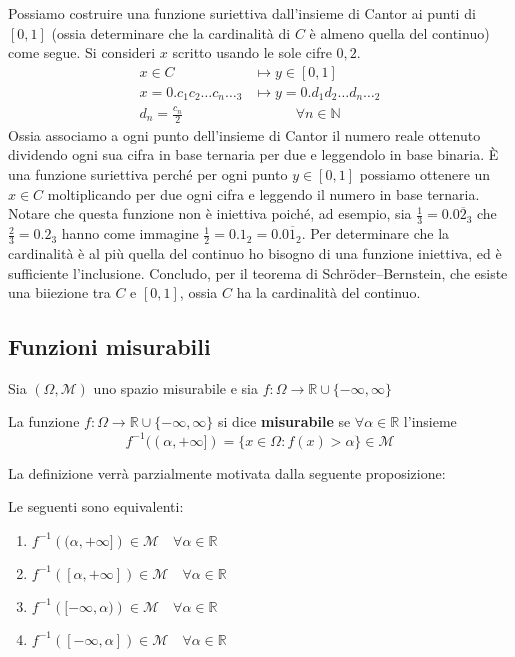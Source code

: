 \begin{example}
    Possiamo costruire una funzione suriettiva
    dall'insieme di Cantor ai punti di \([0, 1]\) (ossia determinare che la cardinalità di \(C\) è almeno quella del continuo) come segue. Si consideri \(x\) scritto usando le sole cifre \(0, 2\). 
    \begin{align*}
        x \in C &\longmapsto y \in [0, 1] \\
        x = 0.c_{1}c_{2}\dots c_{n}\dots_3 &\longmapsto y =
        0.d_{1}d_{2}\dots d_{n}\dots_2 \\
        d_{n} = \frac{c_{n}}{2} \,&\quad\quad\quad \forall n \in \mathbb{N}
    \end{align*}
    Ossia associamo a ogni punto dell'insieme di Cantor il numero reale ottenuto
    dividendo ogni sua cifra in base ternaria per due e leggendolo in base
    binaria. È una funzione suriettiva perché per ogni punto \(y \in [0, 1]\) possiamo
    ottenere un \(x \in C\) moltiplicando per due ogni cifra e leggendo il
    numero in base ternaria. Notare che questa funzione non è iniettiva poiché,
    ad esempio, sia \(\frac{1}{3} = 0.0\overline{2}_3\) che \(\frac{2}{3} =
    0.2_3\) hanno come immagine \(\frac{1}{2} = 0.1_2 = 0.0\overline{1}_2\). Per
    determinare che la cardinalità è al più quella del continuo ho bisogno di
    una funzione iniettiva, ed è sufficiente l'inclusione. Concludo, per il
    teorema di Schröder–Bernstein, che esiste una biiezione tra \(C\) e \(
    [0,1]\), ossia \(C\) ha la cardinalità del continuo. 
\end{example}
\subsection{Funzioni misurabili}
Sia \((\Omega, \mathcal{M})\) uno spazio misurabile e sia \(f: \Omega \to
\mathbb{R} \cup \{-\infty, \infty\}\) 
\begin{definition}
    La funzione \(f : \Omega \to \mathbb{R} \cup \{-\infty, \infty \}\) si dice \textbf{misurabile} se \(\forall \alpha \in \mathbb{R}\) l'insieme
    \[
        f^{-1}((\alpha, +\infty]) = \{x \in \Omega : f(x) > \alpha\} \in \mathcal{M}
    \]
\end{definition}
La definizione verrà parzialmente motivata dalla seguente proposizione:
\begin{proposition}
    Le seguenti sono equivalenti:
\begin{enumerate}[label = \roman*)]
    \item \(f ^{-1}\left((\alpha, +\infty]\right) \in \mathcal{M} \quad \forall \alpha \in \mathbb{R}\)
    \item \(f ^{-1}\left([\alpha, +\infty]\right) \in \mathcal{M} \quad \forall \alpha \in
        \mathbb{R}\)
    \item \(f ^{-1}\left([-\infty, \alpha)\right) \in \mathcal{M} \quad \forall \alpha \in
        \mathbb{R}\)
    \item \(f ^{-1}\left([-\infty, \alpha]\right) \in \mathcal{M} \quad \forall \alpha \in 
        \mathbb{R}\) 
\end{enumerate}
\end{proposition}

